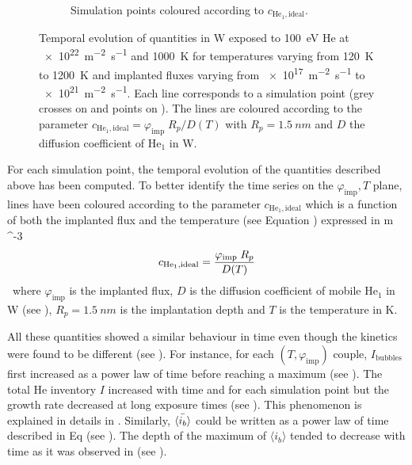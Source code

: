 \begin{figure} [ht!]
\begin{subfigure}{0.5\linewidth}
        \caption{Simulation points coloured according to $c_{\mathrm{He}_1, \mathrm{ideal}}$.}
    \end{subfigure}
    \caption{Temporal evolution of quantities in W exposed to \SI{100}{eV} He at \SI{e22}{m^{-2}.s^{-1}} and \SI{1000}{K} for temperatures varying from \SI{120}{K} to \SI{1200}{K} and implanted fluxes varying from \SI{e17}{m^{-2}s^{-1}} to \SI{e21}{m^{-2}s^{-1}}. Each line corresponds to a simulation point (grey crosses on  and points on ). The lines are coloured according to the parameter $c_{\mathrm{He}_1, \mathrm{ideal}} = \varphi_\mathrm{imp} \; R_p/D(T)$ with $R_p = \SI{1.5}{nm}$ and $D$ the diffusion coefficient of $\mathrm{He}_1$ in W.}
\end{figure}

For each simulation point, the temporal evolution of the quantities described above has been computed.
To better identify the time series on the $\varphi_\mathrm{imp}, T$ plane, lines have been coloured according to the parameter $c_{\mathrm{He}_1, \mathrm{ideal}}$ which is a function of both the implanted flux and the temperature (see Equation ) expressed in \si{m ^{-3}}.

\begin{equation}
    c_{\mathrm{He}_1, \mathrm{ideal}} = \frac{\varphi_\mathrm{imp} \; R_p}{D(T)}
    \labeq{c he1 ideal}
\end{equation}
where $\varphi_\mathrm{imp}$ is the implanted flux, $D$ is the diffusion coefficient of mobile $\mathrm{He}_1$ in W (see ), $R_p = \SI{1.5}{nm}$ is the implantation depth and $T$ is the temperature in \si{K}.

All these quantities showed a similar behaviour in time even though the kinetics were found to be different (see ).
For instance, for each $(T, \varphi_\mathrm{imp})$ couple, $I_\mathrm{bubbles}$ first increased as a power law of time before reaching a maximum (see ).
The total He inventory $I$ increased with time and for each simulation point but the growth rate decreased at long exposure times (see ).
This phenomenon is explained in details in .
Similarly, $\Bar{\langle i_b \rangle}$ could be written as a power law of time described in Eq  (see ).
The depth of the maximum of $\langle i_b \rangle$ tended to decrease with time as it was observed in  (see ).

